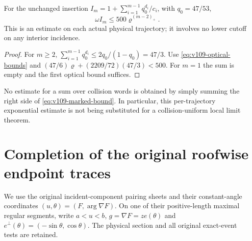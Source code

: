 \begin{corollary}
\label{cor:v109-marked}
For the unchanged insertion
$I_m=1+\sum_{i=1}^{m-1}q_0^{d_i}/c_i$, with $q_0=47/53$,
\begin{equation}\label{eq:v109-marked-bound}
 \omega I_m\leq500\varrho^{(m-2)_+}.
\end{equation}
This is an estimate on each actual physical trajectory; it involves
no lower cutoff on any interior incidence.
\end{corollary}
\begin{proof}
For $m\geq2$,
$\sum_{i=1}^{m-1}q_0^{d_i}\leq2q_0/(1-q_0)=47/3$.
Use \eqref{eq:v109-optical-bounds} and
$(47/6)\varrho+(2209/72)(47/3)<500$.
For $m=1$ the sum is empty and the first optical bound suffices.
\end{proof}
No estimate for a sum over collision words is obtained by simply
summing the right side of \eqref{eq:v109-marked-bound}. In particular,
this per-trajectory exponential estimate is not being substituted for
a collision-uniform local limit theorem.

\section{Completion of the original roofwise endpoint traces}
\label{sec:v109-traces}
We use the original incident-component pairing sheets and their
constant-angle coordinates $(u,\theta)=(F,\arg\nabla F)$.
On one of their positive-length maximal regular segments, write
$a<u<b$, $g=\nabla F=z e(\theta)$ and
$e^\perp(\theta)=(-\sin\theta,\cos\theta)$.
The physical section and all original exact-event tests are retained.

